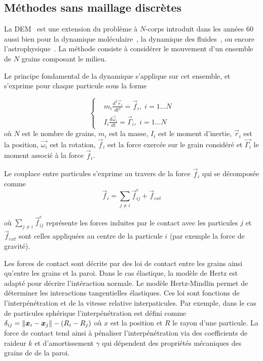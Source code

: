 \subsection{Méthodes sans maillage discrètes}

La DEM~\cite{cundall_discrete_1979} est une extension du problème à $N$-corps introduit dans les années 60 aussi bien pour la dynamique moléculaire~\cite{Alder1959}, la dynamique des fluides~\cite{Allen1987}, ou encore l'astrophysique~\cite{vonHoerner1960}.
La méthode consiste à considérer le mouvement d'un ensemble de $N$ grains composant le milieu.

Le principe fondamental de la dynamique s'applique sur cet ensemble, et s'exprime pour chaque particule sous la forme

\begin{equation*}
    \left\{
    \begin{aligned}
         & m_{i} \frac{ d^{2}\vec{r}_i }{dt^2}=\vec{f}_{i},\; i=1\ldots N      \\
         & I_{i} \frac{d \vec{\omega}_{i}}{dt}=\vec{\Gamma}_{i},\; i=1\ldots N
    \end{aligned}
    \right.
\end{equation*}où $N$ est le nombre de grains, $m_{i}$ est la masse, $I_i$ est le moment d'inertie, $\vec{r}_{i}$ est la position, $\vec{\omega_{i}}$ est la rotation, $\vec{f}_{i}$ est la force exercée sur le grain considéré et $\vec{\Gamma_{i}}$ le moment associé à la force $\vec{f}_{i}$.

Le couplace entre particules s'exprime au travers de la force $\vec{f}_{i}$ qui se décomposée comme
\begin{equation*}
    \vec{f}_{i}=\underset{{\scriptstyle j\neq i}}{\sum}\vec{f}^{c}_{ij}+\vec{f}_{ext}
\end{equation*}

où $\underset{{\scriptstyle j\neq i}}{\sum}\vec{f}^{c}_{ij}$ représente les forces induites par le contact avec les particules $j$ et $\vec{f}_{ext}$ sont celles appliquées au centre de la particule $i$ (par exemple la force de gravité).

Les forces de contact sont décrite par des loi de contact entre les grains ainsi qu'entre les grains et la paroi. Dans le cas élastique, la modèle de Hertz est adapté pour décrire l'intéraction normale. Le modèle Hertz-Mindlin permet de déterminer les interactions tangentielles élastiques. Ces loi sont fonctions de l'interpénétration et de la vitesse relative interpaticules. Par exemple, dans le cas de particules sphérique l'interpénétration est défini comme $\delta_{ij} = \left\lVert \bm x_i - \bm x_j \right\rVert - (R_i - R_j)$ où $x$  est la position et $R$ le rayon d'une particule.
La force de contact tend ainsi à pénaliser l'interpénétration via des coefficients de raideur $k$ et d'amortissement $\gamma$ qui dépendent des propriétés mécaniques des grains de de la paroi.


